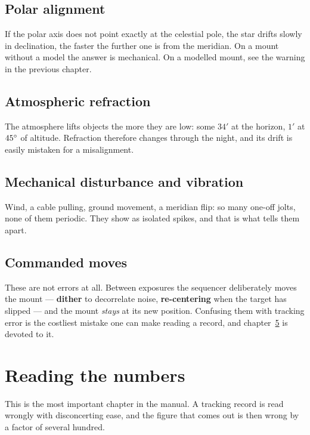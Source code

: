 \section{Polar alignment}

If the polar axis does not point exactly at the celestial pole, the star drifts
slowly in declination, the faster the further one is from the meridian. On a
mount without a model the answer is mechanical. On a modelled mount, see the
warning in the previous chapter.

\section{Atmospheric refraction}

The atmosphere lifts objects the more they are low: some $34'$ at the horizon,
$1'$ at $45^\circ$ of altitude. Refraction therefore changes through the night,
and its drift is easily mistaken for a misalignment.

\section{Mechanical disturbance and vibration}

Wind, a cable pulling, ground movement, a meridian flip: so many one-off jolts,
none of them periodic. They show as isolated spikes, and that is what tells
them apart.

\section{Commanded moves}

These are not errors at all. Between exposures the sequencer deliberately moves
the mount --- \textbf{dither} to decorrelate noise, \textbf{re-centering} when
the target has slipped --- and the mount \emph{stays} at its new position.
Confusing them with tracking error is the costliest mistake one can make
reading a record, and chapter~\ref{ch:stats} is devoted to it.

\chapter{Reading the numbers}
\label{ch:stats}

\begin{warning}
This is the most important chapter in the manual. A tracking record is read
wrongly with disconcerting ease, and the figure that comes out is then wrong by
a factor of several hundred.
\end{warning}

